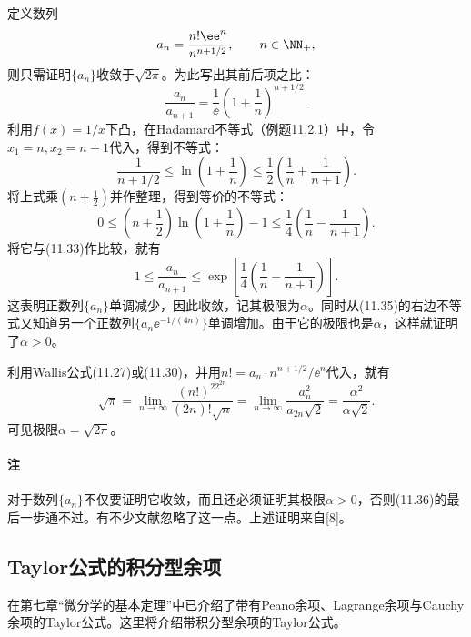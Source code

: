 \begin{xproof}
定义数列
\[
  a_n=\frac{n!\ee^n}{n^{n+1/2}},\qquad n\in\NN_+,
\]
则只需证明$\{a_n\}$收敛于$\sqrt{2\pi}$。为此写出其前后项之比：
\begin{equation}
  \frac{a_n}{a_{n+1}}=\frac1\ee\left(1+\frac1n\right)^{n+1/2}.
  \tag{11.33}
  \label{eq:11.33}
\end{equation}
利用$f(x)=1/x$下凸，在Hadamard不等式（例题11.2.1）中，令$x_1=n,x_2=n+1$代入，得到不等式：
\[
  \frac1{n+1/2}\le\ln\left(1+\frac1n\right)
  \le\frac12\left(\frac1n+\frac1{n+1}\right).
\]
将上式乘$\left(n+\frac12\right)$并作整理，得到等价的不等式：
\begin{equation}
  0\le\left(n+\frac12\right)\ln\left(1+\frac1n\right)-1
  \le\frac14\left(\frac1n-\frac1{n+1}\right).
  \tag{11.34}
  \label{eq:11.34}
\end{equation}
将它与(11.33)作比较，就有
\begin{equation}
  1\le\frac{a_n}{a_{n+1}}
  \le\exp\left[\frac14\left(\frac1n-\frac1{n+1}\right)\right].
  \tag{11.35}
  \label{eq:11.35}
\end{equation}
这表明正数列$\{a_n\}$单调减少，因此收敛，记其极限为$\alpha$。同时从(11.35)的右边不等式又知道另一个正数列$\{a_n\ee^{-1/(4n)}\}$单调增加。由于它的极限也是$\alpha$，这样就证明了$\alpha>0$。

利用Wallis公式(11.27)或(11.30)，并用$n!=a_n\cdot n^{n+1/2}/\ee^n$代入，就有
\begin{equation}
  \sqrt\pi
  =\lim_{n\to\infty}\frac{(n!)^22^{2n}}{(2n)!\sqrt n}
  =\lim_{n\to\infty}\frac{a_n^2}{a_{2n}\sqrt2}
  =\frac{\alpha^2}{\alpha\sqrt2}.
  \tag{11.36}
  \label{eq:11.36}
\end{equation}
可见极限$\alpha=\sqrt{2\pi}$。
\end{xproof}

\paragraph{注} 对于数列$\{a_n\}$不仅要证明它收敛，而且还必须证明其极限$\alpha>0$，否则(11.36)的最后一步通不过。有不少文献忽略了这一点。上述证明来自[8]。

\subsection{Taylor公式的积分型余项}

在第七章“微分学的基本定理”中已介绍了带有Peano余项、Lagrange余项与Cauchy余项的Taylor公式。这里将介绍带积分型余项的Taylor公式。

